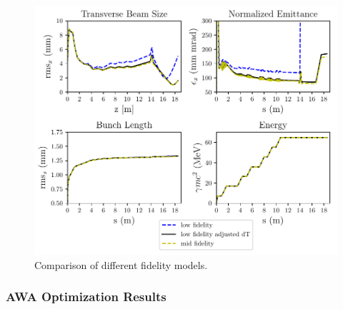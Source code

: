 \begin{figure}
	\centering
	\includegraphics[width=0.8\linewidth]{Report/timestep_comparison}
	\caption{Comparison of different fidelity models.}
	\label{tstep}
\end{figure}


\subsubsection{AWA Optimization Results}


